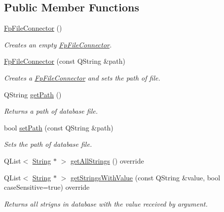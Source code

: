 \subsection*{Public Member Functions}
\begin{DoxyCompactItemize}
\item 
\mbox{\label{classFpFileConnector_a2e474f8746dd54729fe68c224ff24275}} 
\mbox{\hyperlink{classFpFileConnector_a2e474f8746dd54729fe68c224ff24275}{Fp\+File\+Connector}} ()
\begin{DoxyCompactList}\small\item\em Creates an empty \mbox{\hyperlink{classFpFileConnector}{Fp\+File\+Connector}}. \end{DoxyCompactList}\item 
\mbox{\hyperlink{classFpFileConnector_a51b38b735ab4728601aef295d7b4c21f}{Fp\+File\+Connector}} (const Q\+String \&path)
\begin{DoxyCompactList}\small\item\em Creates a \mbox{\hyperlink{classFpFileConnector}{Fp\+File\+Connector}} and sets the path of file. \end{DoxyCompactList}\item 
Q\+String \mbox{\hyperlink{classFpFileConnector_af1a00dabd759abd0b59bf9e26edc73cf}{get\+Path}} ()
\begin{DoxyCompactList}\small\item\em Returns a path of database file. \end{DoxyCompactList}\item 
bool \mbox{\hyperlink{classFpFileConnector_a7a5c2987feae762ce359de702f5702e3}{set\+Path}} (const Q\+String \&path)
\begin{DoxyCompactList}\small\item\em Sets the path of database file. \end{DoxyCompactList}\item 
Q\+List$<$ \mbox{\hyperlink{classString}{String}} $\ast$ $>$ \mbox{\hyperlink{classFpFileConnector_ad392db922a5e04a670b84fc616192eea}{get\+All\+Strings}} () override
\item 
Q\+List$<$ \mbox{\hyperlink{classString}{String}} $\ast$ $>$ \mbox{\hyperlink{classFpFileConnector_a72a6ca5a5b8a44783d2ed990b111675b}{get\+Strings\+With\+Value}} (const Q\+String \&value, bool case\+Sensitive=true) override
\begin{DoxyCompactList}\small\item\em Returns all strigns in database with the value received by argument. \end{DoxyCompactList}\item 

\end{DoxyCompactItemize}
